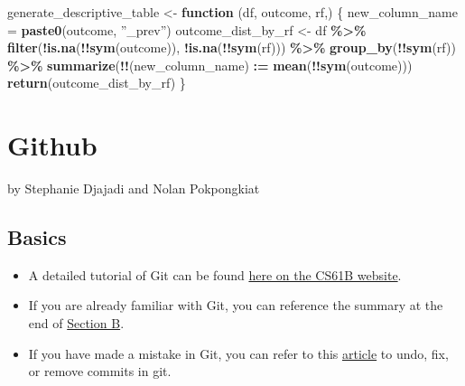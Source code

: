 \documentclass[
]{book}
\newenvironment{Shaded}{\begin{snugshade}}{\end{snugshade}}
\newcommand{\ControlFlowTok}[1]{\textcolor[rgb]{0.13,0.29,0.53}{\textbf{#1}}}
\newcommand{\FunctionTok}[1]{\textcolor[rgb]{0.13,0.29,0.53}{\textbf{#1}}}
\newcommand{\NormalTok}[1]{#1}
\newcommand{\OtherTok}[1]{\textcolor[rgb]{0.56,0.35,0.01}{#1}}
\newcommand{\SpecialCharTok}[1]{\textcolor[rgb]{0.81,0.36,0.00}{\textbf{#1}}}
\providecommand{\tightlist}{%
  \setlength{\itemsep}{0pt}\setlength{\parskip}{0pt}}
\begin{document}
\begin{Shaded}
\begin{Highlighting}[]
\NormalTok{generate\_descriptive\_table }\OtherTok{\textless{}{-}} \ControlFlowTok{function}\NormalTok{ (df, outcome, rf,) \{}
\NormalTok{  new\_column\_name }\OtherTok{=} \FunctionTok{paste0}\NormalTok{(outcome, ”\_prev”)}
\NormalTok{  outcome\_dist\_by\_rf }\OtherTok{\textless{}{-}}\NormalTok{ df }\SpecialCharTok{\%\textgreater{}\%} 
  \FunctionTok{filter}\NormalTok{(}\SpecialCharTok{!}\FunctionTok{is.na}\NormalTok{(}\SpecialCharTok{!!}\FunctionTok{sym}\NormalTok{(outcome)), }\SpecialCharTok{!}\FunctionTok{is.na}\NormalTok{(}\SpecialCharTok{!!}\FunctionTok{sym}\NormalTok{(rf))) }\SpecialCharTok{\%\textgreater{}\%} 
  \FunctionTok{group\_by}\NormalTok{(}\SpecialCharTok{!!}\FunctionTok{sym}\NormalTok{(rf)) }\SpecialCharTok{\%\textgreater{}\%}
  \FunctionTok{summarize}\NormalTok{(}\SpecialCharTok{!!}\NormalTok{(new\_column\_name) }\SpecialCharTok{:=} \FunctionTok{mean}\NormalTok{(}\SpecialCharTok{!!}\FunctionTok{sym}\NormalTok{(outcome))) }
  \FunctionTok{return}\NormalTok{(outcome\_dist\_by\_rf)}
\NormalTok{\}}
\end{Highlighting}
\end{Shaded}

\chapter{Github}\label{github}

by Stephanie Djajadi and Nolan Pokpongkiat

\section{Basics}\label{basics}

\begin{itemize}
\tightlist
\item
  A detailed tutorial of Git can be found \href{https://sp19.datastructur.es/materials/guides/using-git\#b-local-repositories-narrative-introduction}{here on the CS61B website}.
\item
  If you are already familiar with Git, you can reference the summary at the end of \href{https://sp19.datastructur.es/materials/guides/using-git\#b-local-repositories-narrative-introduction}{Section B}.
\item
  If you have made a mistake in Git, you can refer to this \href{https://sethrobertson.github.io/GitFixUm/fixup.html}{article} to undo, fix, or remove commits in git.
\end{itemize}
\end{document}
